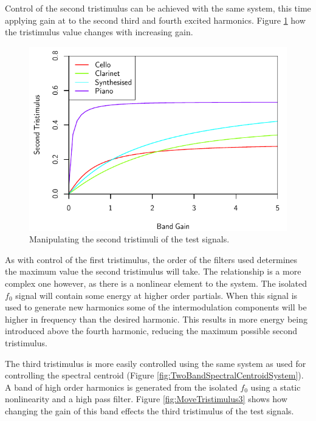 		Control of the second tristimulus can be achieved with the same system, this time applying gain at to the
		second third and fourth excited harmonics. Figure \ref{fig:MoveTristimulus2} how the tristimulus value
		changes with increasing gain.

		\begin{figure}[h!]
			\centering
			\includegraphics{chapter6/Images/MoveTristimulus2.pdf}
			\caption{Manipulating the second tristimuli of the test signals.}
			\label{fig:MoveTristimulus2}
		\end{figure}

		As with control of the first tristimulus, the order of the filters used determines the maximum value the
		second tristimulus will take. The relationship is a more complex one however, as there is a nonlinear
		element to the system. The isolated $f_{0}$ signal will contain some energy at higher order partials.  When
		this signal is used to generate new harmonics some of the intermodulation components will be higher in
		frequency than the desired harmonic. This results in more energy being introduced above the fourth
		harmonic, reducing the maximum possible second tristimulus.

		The third tristimulus is more easily controlled using the same system as used for controlling the spectral
		centroid (Figure \ref{fig:TwoBandSpectralCentroidSystem}). A band of high order harmonics is generated from
		the isolated $f_{0}$ using a static nonlinearity and a high pass filter.  Figure \ref{fig:MoveTristimulus3}
		shows how changing the gain of this band effects the third tristimulus of the test signals.


